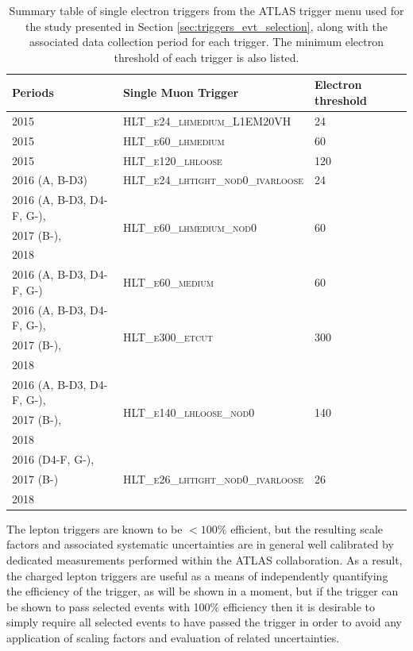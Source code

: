 \begin{table}[ht]
\caption{Summary table of single electron triggers from the ATLAS trigger menu used for the study presented in Section \ref{sec:triggers_evt_selection}, along with the associated data collection period for each trigger. The minimum electron \pt threshold of each trigger is also listed.}
\label{tab:summary_electron_triggers_used}
\footnotesize{
	\begin{center}
	\begin{tabular}{l l l }
		\toprule
			Periods & Single Muon Trigger & Electron \pt threshold \\
			\midrule
			\midrule
			2015 & \textsc{HLT\_e24\_lhmedium\_L1EM20VH} & 24 \GeV \\
			\midrule
			2015 & \textsc{HLT\_e60\_lhmedium} & 60 \GeV \\
			\midrule
			2015 & \textsc{HLT\_e120\_lhloose} & 120 \GeV \\
			\midrule
			2016 (A, B-D3) & \textsc{HLT\_e24\_lhtight\_nod0\_ivarloose} & 24 \GeV \\
			\midrule
			2016 (A, B-D3, D4-F, G-), & \multirow{3}{*}{\textsc{HLT\_e60\_lhmedium\_nod0}} & \multirow{3}{*}{60 \GeV} \\
			2017 (B-), & & \\
			2018 & & \\
			\midrule
			2016 (A, B-D3, D4-F, G-)  & \textsc{HLT\_e60\_medium} & 60 \GeV \\
			\midrule
			2016 (A, B-D3, D4-F, G-),  & \multirow{3}{*}{\textsc{HLT\_e300\_etcut}} & \multirow{3}{*}{300 \GeV} \\
			2017 (B-), & & \\
			2018 \\
			\midrule
			2016 (A, B-D3, D4-F, G-), & \multirow{3}{*}{\textsc{HLT\_e140\_lhloose\_nod0}} & \multirow{3}{*}{140 \GeV} \\
			2017 (B-), & & \\
			2018 & & \\
			\midrule
			2016 (D4-F, G-), & \multirow{3}{*}{\textsc{HLT\_e26\_lhtight\_nod0\_ivarloose}} & \multirow{3}{*}{26 \GeV} \\
			2017 (B-) & & \\
			2018 & & \\
		\bottomrule
	\end{tabular}
	\end{center}
	}
\end{table}

The lepton triggers are known to be \(<100\%\) efficient, but the resulting scale factors and associated systematic uncertainties are in general well calibrated by dedicated measurements performed within the ATLAS collaboration. As a result, the charged lepton triggers are useful as a means of independently quantifying the efficiency of the \met trigger, as will be shown in a moment, but if the \met trigger can be shown to pass selected events with 100\% efficiency then it is desirable to simply require all selected events to have passed the \met trigger in order to avoid any application of scaling factors and evaluation of related uncertainties.

